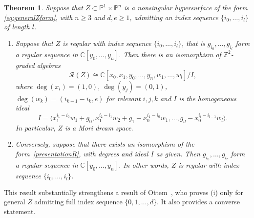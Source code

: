 \documentclass[a4paper,11pt]{amsart}
\theoremstyle{plain}
\newtheorem{theorem}{Theorem}[section]
\theoremstyle{definition}
\newcommand{\C}{\mathbb{C}}
\newcommand{\p}{\mathbb{P}}
\newcommand{\R}{\mathcal{R}}
\newcommand{\Z}{\mathbb{Z}}
\begin{document}
\begin{theorem} \label{thm:mainintro}
Suppose that $Z\subset\p^1\times\p^n$ is a nonsingular hypersurface of the form \eqref{eq:generalZform}, 
with $n \geq 3$ and $d,e \geq 1$, admitting an index sequence $\{i_0,\dots,i_l\}$ of length $l$.
\begin{enumerate}
\item[(i)] Suppose that $Z$ is regular with index sequence $\{i_0,\dots,i_l\}$, that is $g_{i_0},\dots,g_{i_l}$ form a regular sequence in $\C[y_0,\dots,y_n]$. Then there is an isomorphism of $\Z^2$-graded algebras
\begin{equation}\label{presentationR}
    \R(Z)\cong \C[x_0,x_1,y_0,\dots,y_n,w_1,\dots,w_l]/I,
    \end{equation}
    where $\deg(x_i) = (1,0)$, $\deg (y_j) = (0,1)$, $\deg(w_k) = (i_{k-1}-i_k,e)$ for relevant $i,j,k$ and $I$ is the homogeneous ideal
    \[
    I = \langle x_1^{i_1-i_0} w_1 + g_0, x_1^{i_2-i_1} w_2 + g_1 - x_0^{i_1-i_0} w_1,\ldots, g_d - x_0^{i_l-i_{l-1}} w_l\rangle.
    \]
    In particular, $Z$ is a Mori dream space. 
\item[(ii)] Conversely, suppose that there exists an isomorphism of the form~\eqref{presentationR}, with degrees and ideal $I$ as given. Then $g_{i_0},\dots,g_{i_l}$ form a regular sequence in $\C[y_0,\dots,y_n]$. In other words, $Z$ is regular with index sequence $\{i_0,\dots,i_l\}$.
\end{enumerate}
\end{theorem}

This result substantially strengthens a result of Ottem~\cite{ottem}, who proves (i) only for general $Z$ admitting full index sequence $\{0,1,\dots,d\}$. It also provides a converse statement.
\end{document}
